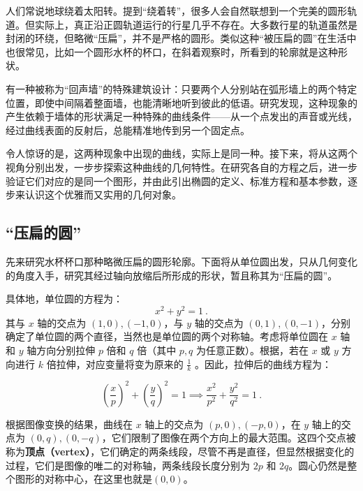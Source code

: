 

人们常说地球绕着太阳转。提到“绕着转”，很多人会自然联想到一个完美的圆形轨道。但实际上，真正沿正圆轨道运行的行星几乎不存在。大多数行星的轨道虽然是封闭的环绕，但略微“压扁”，并不是严格的圆形。类似这种“被压扁的圆”在生活中也很常见，比如一个圆形水杯的杯口，在斜着观察时，所看到的轮廓就是这种形状。

有一种被称为“回声墙”的特殊建筑设计：只要两个人分别站在弧形墙上的两个特定位置，即使中间隔着整面墙，也能清晰地听到彼此的低语。研究发现，这种现象的产生依赖于墙体的形状满足一种特殊的曲线条件——从一个点发出的声音或光线，经过曲线表面的反射后，总能精准地传到另一个固定点。

令人惊讶的是，这两种现象中出现的曲线，实际上是同一种。接下来，将从这两个视角分别出发，一步步探索这种曲线的几何特性。在研究各自的方程之后，进一步验证它们对应的是同一个图形，并由此引出椭圆的定义、标准方程和基本参数，逐步来认识这个优雅而又实用的几何对象。

\subsection{“压扁的圆”}\label{sub_Elips3_1}

先来研究水杯杯口那种略微压扁的圆形轮廓。下面将从单位圆出发，只从几何变化的角度入手，研究其经过轴向放缩后所形成的形状，暂且称其为“压扁的圆”。

具体地，单位圆的方程为：
\begin{equation}
x^2 + y^2 = 1~.
\end{equation}
其与 $x$ 轴的交点为 $(1, 0), (-1, 0)$，与 $y$ 轴的交点为 $(0, 1), (0, -1)$，分别确定了单位圆的两个直径，当然也是单位圆的两个对称轴。考虑将单位圆在 $x$ 轴和 $y$ 轴方向分别拉伸 $p$ 倍和 $q$ 倍（其中 $p, q$ 为任意正数）。根据，若在 $x$ 或 $y$ 方向进行 $k$ 倍拉伸，对应变量将变为原来的 $\displaystyle\frac{1}{k}$ 。因此，拉伸后的曲线方程为：

\begin{equation}\label{eq_Elips3_2}
\left(\frac{x}{p}\right)^2 + \left(\frac{y}{q}\right)^2 = 1\implies\frac{x^2}{p^2} + \frac{y^2}{q^2} = 1~.
\end{equation}

根据图像变换的结果，曲线在 $x$ 轴上的交点为 $(p, 0), (-p, 0)$，在 $y$ 轴上的交点为 $(0, q), (0, -q)$，它们限制了图像在两个方向上的最大范围。这四个交点被称为\textbf{顶点（vertex）}，它们确定的两条线段，尽管不再是直径，但显然根据变化的过程，它们是图像的唯二的对称轴，两条线段长度分别为 $2p$ 和 $2q$。圆心仍然是整个图形的对称中心，在这里也就是$(0,0)$。

